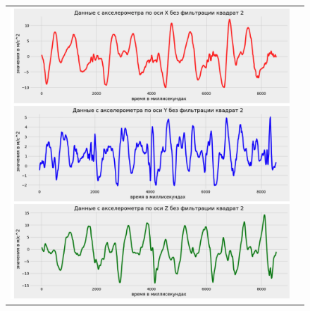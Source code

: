\begin{figure}[H]
    \begin{center}
        \begin{tabular}{cc}
            \includegraphics[width=1\textwidth]{farim/sq} & 
        \end{tabular}
    \end{center}
\end{figure}


